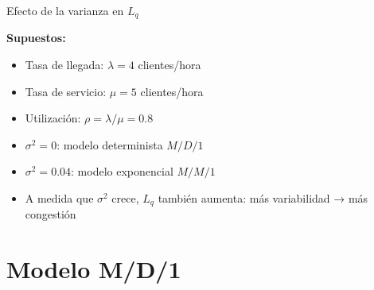 \documentclass{beamer}
\begin{document}
\begin{frame}{Efecto de la varianza en \texorpdfstring{$L_q$}{Lq}}

  \textbf{Supuestos:}
  \begin{itemize}
    \item Tasa de llegada: \( \lambda = 4 \) clientes/hora
    \item Tasa de servicio: \( \mu = 5 \) clientes/hora
    \item Utilización: \( \rho = \lambda / \mu = 0.8 \)
  \end{itemize}

  \vspace{0.5em}
  \begin{center}
  \end{center}

  \pause
  \begin{itemize}
    \item \( \sigma^2 = 0 \): modelo determinista \( M/D/1 \)
    \item \( \sigma^2 = 0.04 \): modelo exponencial \( M/M/1 \)
    \item A medida que \( \sigma^2 \) crece, \( L_q \) también aumenta: más variabilidad → más congestión
  \end{itemize}
\end{frame}


\section*{Modelo M/D/1}
\end{document}
